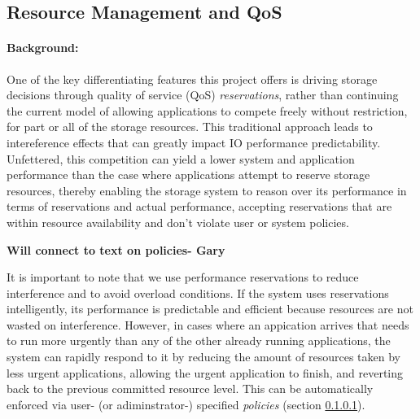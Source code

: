 \subsection{Resource Management and QoS}

\paragraph{Background:} One of the key differentiating features this project offers is driving storage
decisions through quality of service (QoS) \emph{reservations}, rather than continuing the current model
of allowing applications to compete freely without restriction, for part or all of the storage
resources. This traditional approach leads to intereference effects
\cite{lofstead:2010:adaptive,liu_hotstorage} that can greatly impact IO performance predictability. 
Unfettered, this competition can yield a lower system and application performance 
than the case where applications attempt to reserve storage resources, thereby enabling the storage system
to reason over its performance in terms of reservations and actual
performance, accepting reservations that are within resource
availability and don't violate user or system policies.

{\bf {\color{red}Will connect to text on policies- Gary}}

It is important to note that we use performance reservations to
reduce interference and to avoid overload conditions. If the system
uses reservations intelligently, its performance is predictable and
efficient because resources are not wasted on interference. However,
in cases where an appication arrives that needs to run more urgently
than any of the other already running applications, the system
can rapidly respond to it by reducing the amount of resources taken 
by less urgent applications, allowing the urgent application to finish,
and reverting back to the previous committed resource level. This can
be automatically enforced via user- (or adiminstrator-) specified \textit{policies}
(section \ref{}).

